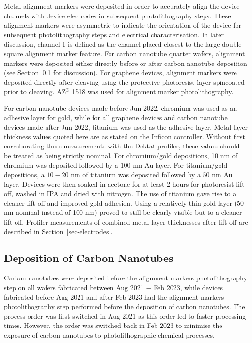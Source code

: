 \documentclass[
  a4paper,
]{scrbook}
\begin{document}
Metal alignment markers were deposited in order to accurately align the
device channels with device electrodes in subsequent photolithography
steps. These alignment markers were asymmetric to indicate the
orientation of the device for subsequent photolithography steps and
electrical characterisation. In later discussion, channel 1 is defined
as the channel placed closest to the large double square alignment
marker feature. For carbon nanotube quarter wafers, alignment markers
were deposited either directly before or after carbon nanotube
deposition (see Section~\ref{sec-dep-carbon-nanotubes} for discussion).
For graphene devices, alignment markers were deposited directly after
cleaving using the protective photoresist layer spincoated prior to
cleaving. AZ\(^\circledR\) 1518 was used for alignment marker
photolithography.

For carbon nanotube devices made before Jun 2022, chromium was used as
an adhesive layer for gold, while for all graphene devices and carbon
nanotube devices made after Jun 2022, titanium was used as the adhesive
layer. Metal layer thickness values quoted here are as stated on the
Inficon controller. Without first corroborating these measurements with
the Dektat profiler, these values should be treated as being strictly
nominal. For chromium/gold depositions, 10 nm of chromium was deposited
followed by a 100 nm Au layer. For titanium/gold depositions, a
\(10-20\) nm of titanium was deposited followed by a 50 nm Au layer.
Devices were then soaked in acetone for at least 2 hours for photoresist
lift-off, washed in IPA and dried with nitrogen. The use of titanium
gave rise to a cleaner lift-off and improved gold adhesion. Using a
relatively thin gold layer (50 nm nominal instead of 100 nm) proved to
still be clearly visible but to a cleaner lift-off. Profiler
measurements of combined metal layer thicknesses after lift-off are
described in Section~\ref{sec-electrodes}.

\hypertarget{sec-dep-carbon-nanotubes}{%
\subsection{Deposition of Carbon
Nanotubes}\label{sec-dep-carbon-nanotubes}}

Carbon nanotubes were deposited before the alignment markers
photolithography step on all wafers fabricated between Aug 2021 \(-\)
Feb 2023, while devices fabricated before Aug 2021 and after Feb 2023
had the alignment markers photolithography step performed before the
deposition of carbon nanotubes. The process order was first switched in
Aug 2021 as this order led to faster processing times. However, the
order was switched back in Feb 2023 to minimise the exposure of carbon
nanotubes to photolithographic chemical processes.
\end{document}
